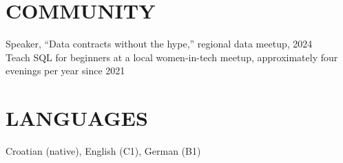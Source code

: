 \documentclass[11pt,a4paper]{article}
\begin{document}
\section*{COMMUNITY}
Speaker, “Data contracts without the hype,” regional data meetup, 2024\\
Teach SQL for beginners at a local women-in-tech meetup, approximately four evenings per year since 2021

\section*{LANGUAGES}
Croatian (native), English (C1), German (B1)
\end{document}
